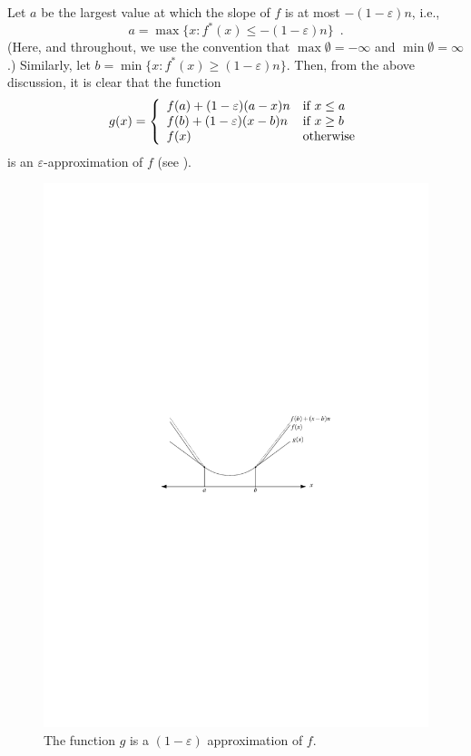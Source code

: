 \documentclass[charterfonts,lotsofwhite]{patmorin}
\newcommand{\eps}{\varepsilon}
\begin{document}
Let $a$ be the largest value at which the slope of $f$ is at most
$-(1-\eps)n$, i.e., 
\[
a=\max\{x:f^*(x)\le -(1-\eps)n \} \enspace .
\]
(Here, and throughout, we use the convention that
$\max\emptyset=-\infty$ and $\min\emptyset=\infty$.)  Similarly, let
$b=\min\{x:f^*(x)\ge (1-\eps) n\}$.  Then, from the above discussion,
it is clear that the function
\begin{equation}
 g(x) = \left\{\begin{array}{ll}
                 f(a) + (1-\eps)(a-x)n & \mbox{if $x\le a$} \\
                 f(b) + (1-\eps)(x-b)n & \mbox{if $x\ge b$} \\
                 f(x)   & \mbox{otherwise} \eqlabel{approx}
 \end{array}\right.
\end{equation}
is an $\eps$-approximation of $f$ (see ).

\begin{figure}
\begin{center}\includegraphics{approx}\end{center}
\caption{The function $g$ is a $(1-\eps)$ approximation of
$f$.}
\end{figure}
\end{document}
